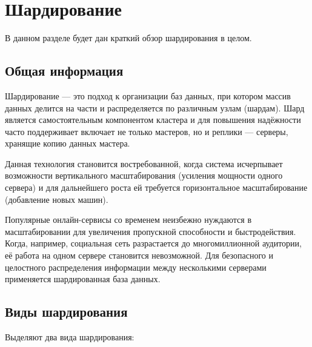 \section{Шардирование}

В данном разделе будет дан краткий обзор шардирования в целом.

\subsection{Общая информация}

Шардирование — это подход к организации баз данных, при котором массив данных
делится на части и распределяется по различным узлам (шардам). Шард является
самостоятельным компонентом кластера и для повышения надёжности часто
поддерживает включает не только мастеров, но и реплики — серверы, хранящие
копию данных мастера.

Данная технология становится востребованной, когда система исчерпывает
возможности вертикального масштабирования (усиления мощности одного сервера) и
для дальнейшего роста ей требуется горизонтальное масштабирование (добавление
новых машин).

Популярные онлайн-сервисы со временем неизбежно нуждаются в масштабировании для
увеличения пропускной способности и быстродействия. Когда, например, социальная
сеть разрастается до многомиллионной аудитории, её работа на одном сервере
становится невозможной. Для безопасного и целостного распределения информации
между несколькими серверами применяется шардированная база данных.

\subsection{Виды шардирования}

Выделяют два вида шардирования:

